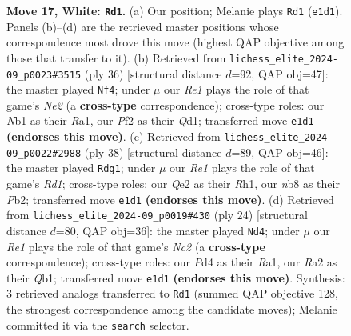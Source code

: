 \documentclass[11pt]{article}
\begin{document}
\begin{figure}[p]
\caption{\textbf{Move 17, White: \texttt{Rd1}.} (a) Our position; Melanie plays \texttt{Rd1} (\texttt{e1d1}). Panels (b)--(d) are the retrieved master positions whose correspondence most drove this move (highest QAP objective among those that transfer to it). (b) Retrieved from \texttt{lichess\_elite\_2024-09\_p0023\#3515} (ply 36) [structural distance $d$=92, QAP obj=47]: the master played \texttt{Nf4}; under $\mu$ our \emph{Re1} plays the role of that game's \emph{Ne2} (a \textbf{cross-type} correspondence); cross-type roles: our \emph{N}b1 as their \emph{R}a1, our \emph{P}f2 as their \emph{Q}d1; transferred move \texttt{e1d1} \textbf{(endorses this move)}. (c) Retrieved from \texttt{lichess\_elite\_2024-09\_p0022\#2988} (ply 38) [structural distance $d$=89, QAP obj=46]: the master played \texttt{Rdg1}; under $\mu$ our \emph{Re1} plays the role of that game's \emph{Rd1}; cross-type roles: our \emph{Q}e2 as their \emph{R}h1, our \emph{n}b8 as their \emph{P}b2; transferred move \texttt{e1d1} \textbf{(endorses this move)}. (d) Retrieved from \texttt{lichess\_elite\_2024-09\_p0019\#430} (ply 24) [structural distance $d$=80, QAP obj=36]: the master played \texttt{Nd4}; under $\mu$ our \emph{Re1} plays the role of that game's \emph{Nc2} (a \textbf{cross-type} correspondence); cross-type roles: our \emph{P}d4 as their \emph{R}a1, our \emph{R}a2 as their \emph{Q}b1; transferred move \texttt{e1d1} \textbf{(endorses this move)}. Synthesis: 3 retrieved analogs transferred to \texttt{Rd1} (summed QAP objective 128, the strongest correspondence among the candidate moves); Melanie committed it via the \texttt{search} selector.}
\label{fig:thought-m32}
\end{figure}

\clearpage
\end{document}
